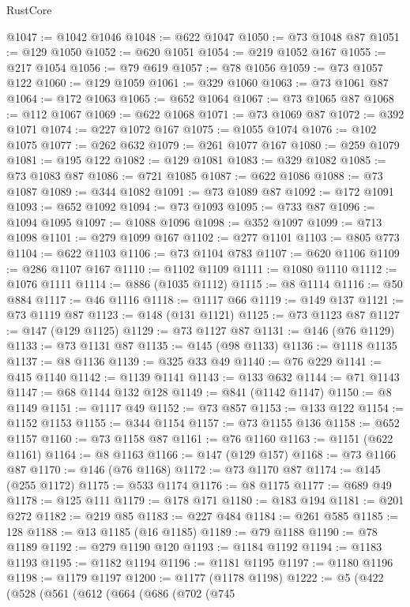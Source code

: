 \begin{lexlean}{RustCore}
\begin{coremodule}
@1047 := @1042 @1046
@1048 := @622 @1047
@1050 := @73 @1048 @87
@1051 := @129 @1050
@1052 := @620 @1051
@1054 := @219 @1052 @167
@1055 := @217 @1054
@1056 := @79 @619
@1057 := @78 @1056
@1059 := @73 @1057 @122
@1060 := @129 @1059
@1061 := @329 @1060
@1063 := @73 @1061 @87
@1064 := @172 @1063
@1065 := @652 @1064
@1067 := @73 @1065 @87
@1068 := @112 @1067
@1069 := @622 @1068
@1071 := @73 @1069 @87
@1072 := @392 @1071
@1074 := @227 @1072 @167
@1075 := @1055 @1074
@1076 := @102 @1075
@1077 := @262 @632
@1079 := @261 @1077 @167
@1080 := @259 @1079
@1081 := @195 @122
@1082 := @129 @1081
@1083 := @329 @1082
@1085 := @73 @1083 @87
@1086 := @721 @1085
@1087 := @622 @1086
@1088 := @73 @1087
@1089 := @344 @1082
@1091 := @73 @1089 @87
@1092 := @172 @1091
@1093 := @652 @1092
@1094 := @73 @1093
@1095 := @733 @87
@1096 := @1094 @1095
@1097 := @1088 @1096
@1098 := @352 @1097
@1099 := @713 @1098
@1101 := @279 @1099 @167
@1102 := @277 @1101
@1103 := @805 @773
@1104 := @622 @1103
@1106 := @73 @1104 @783
@1107 := @620 @1106
@1109 := @286 @1107 @167
@1110 := @1102 @1109
@1111 := @1080 @1110
@1112 := @1076 @1111
@1114 := @886 (@1035 @1112)
@1115 := @8 @1114
@1116 := @50 @884
@1117 := @46 @1116
@1118 := @1117 @66
@1119 := @149 @137
@1121 := @73 @1119 @87
@1123 := @148 (@131 @1121)
@1125 := @73 @1123 @87
@1127 := @147 (@129 @1125)
@1129 := @73 @1127 @87
@1131 := @146 (@76 @1129)
@1133 := @73 @1131 @87
@1135 := @145 (@98 @1133)
@1136 := @1118 @1135
@1137 := @8 @1136
@1139 := @325 @33 @49
@1140 := @76 @229
@1141 := @415 @1140
@1142 := @1139 @1141
@1143 := @133 @632
@1144 := @71 @1143
@1147 := @68 @1144 @132 @128
@1149 := @841 (@1142 @1147)
@1150 := @8 @1149
@1151 := @1117 @49
@1152 := @73 @857
@1153 := @133 @122
@1154 := @1152 @1153
@1155 := @344 @1154
@1157 := @73 @1155 @136
@1158 := @652 @1157
@1160 := @73 @1158 @87
@1161 := @76 @1160
@1163 := @1151 (@622 @1161)
@1164 := @8 @1163
@1166 := @147 (@129 @157)
@1168 := @73 @1166 @87
@1170 := @146 (@76 @1168)
@1172 := @73 @1170 @87
@1174 := @145 (@255 @1172)
@1175 := @533 @1174
@1176 := @8 @1175
@1177 := @689 @49
@1178 := @125 @111
@1179 := @178 @171
@1180 := @183 @194
@1181 := @201 @272
@1182 := @219 @85
@1183 := @227 @484
@1184 := @261 @585
@1185 := 128
@1188 := @13 @1185 (@16 @1185)
@1189 := @79 @1188
@1190 := @78 @1189
@1192 := @279 @1190 @120
@1193 := @1184 @1192
@1194 := @1183 @1193
@1195 := @1182 @1194
@1196 := @1181 @1195
@1197 := @1180 @1196
@1198 := @1179 @1197
@1200 := @1177 (@1178 @1198)
@1222 := @5
    (@422
      (@528
        (@561
          (@612
            (@664
              (@686
                (@702
                  (@745

\end{coremodule}
\end{lexlean}
